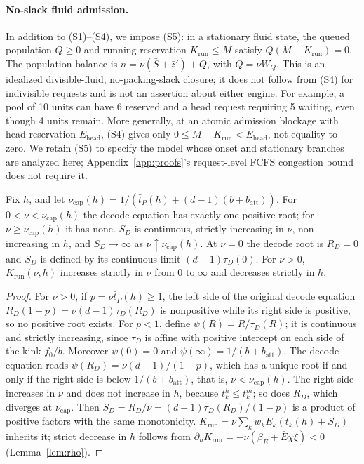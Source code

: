 \paragraph{No-slack fluid admission.} In addition to (S1)--(S4), we impose (S5): in a stationary fluid state, the queued population $Q\ge0$ and running reservation $K_{\mathrm{run}}\le M$ satisfy $Q(M-K_{\mathrm{run}})=0$. The population balance is $n=\nu(\bar S+\bar z')+Q$, with $Q=\nu W_Q$. This is an idealized divisible-fluid, no-packing-slack closure; it does not follow from (S4) for indivisible requests and is not an assertion about either engine. For example, a pool of 10 units can have 6 reserved and a head request requiring 5 waiting, even though 4 units remain. More generally, at an atomic admission blockage with head reservation $E_{\mathrm{head}}$, (S4) gives only $0\le M-K_{\mathrm{run}}<E_{\mathrm{head}}$, not equality to zero. We retain (S5) to specify the model whose onset and stationary branches are analyzed here; Appendix~\ref{app:proofs}'s request-level FCFS congestion bound does not require it.

\begin{lemma}\label{lem:server}
Fix $h$, and let $\nu_{\mathrm{cap}}(h)=1/(\bar t_P(h)+(d-1)(b+b_{\mathrm{att}}))$. For $0<\nu<\nu_{\mathrm{cap}}(h)$ the decode equation has exactly one positive root; for $\nu\ge\nu_{\mathrm{cap}}(h)$ it has none. $S_D$ is continuous, strictly increasing in $\nu$, non-increasing in $h$, and $S_D\to\infty$ as $\nu\uparrow\nu_{\mathrm{cap}}(h)$. At $\nu=0$ the decode root is $R_D=0$ and $S_D$ is defined by its continuous limit $(d-1)\tau_D(0)$. For $\nu>0$, $K_{\mathrm{run}}(\nu,h)$ increases strictly in $\nu$ from $0$ to $\infty$ and decreases strictly in $h$.
\end{lemma}
\begin{proof}
For $\nu>0$, if $p=\nu\bar t_P(h)\ge1$, the left side of the original decode equation $R_D(1-p)=\nu(d-1)\tau_D(R_D)$ is nonpositive while its right side is positive, so no positive root exists. For $p<1$, define $\psi(R)=R/\tau_D(R)$; it is continuous and strictly increasing, since $\tau_D$ is affine with positive intercept on each side of the kink $f_0/b$. Moreover $\psi(0)=0$ and $\psi(\infty)=1/(b+b_{\mathrm{att}})$. The decode equation reads $\psi(R_D)=\nu(d-1)/(1-p)$, which has a unique root if and only if the right side is below $1/(b+b_{\mathrm{att}})$, that is, $\nu<\nu_{\mathrm{cap}}(h)$. The right side increases in $\nu$ and does not increase in $h$, because $t^h_k\le t^m_k$; so does $R_D$, which diverges at $\nu_{\mathrm{cap}}$. Then $S_D=R_D/\nu=(d-1)\tau_D(R_D)/(1-p)$ is a product of positive factors with the same monotonicity. $K_{\mathrm{run}}=\nu\sum_kw_kE_k(t_k(h)+S_D)$ inherits it; strict decrease in $h$ follows from $\partial_hK_{\mathrm{run}}=-\nu(\beta_E+\bar E\chi\xi)<0$ (Lemma~\ref{lem:rho}).
\end{proof}

